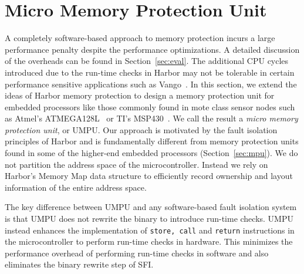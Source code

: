 \section{Micro Memory Protection Unit}
\label{sec:umpu}
%
A completely software-based approach to memory protection incurs a
large performance penalty despite the performance optimizations.
%
A detailed discussion of the overheads can be found in
Section~\ref{sec:eval}.
%
The additional CPU cycles introduced due to the run-time checks in
Harbor may not be tolerable in certain performance sensitive
applications such as Vango~\cite{ben06vango}.
%
In this section, we extend the ideas of Harbor memory protection to
design a memory protection unit for embedded processors like those
%
commonly found in mote class sensor nodes
%
such as Atmel's ATMEGA128L~\cite{avrdatasheet} or TI's
MSP430~\cite{mspdatasheet}.
%
We call the result a \emph{micro memory protection unit}, or UMPU.
%
%
Our approach is motivated by the fault isolation principles of Harbor
and is fundamentally different from memory protection units found in
some of the higher-end embedded processors (Section~\ref{sec:mpu}).
%
We do not partition the address space of the microcontroller.
%
%
%
%
%
Instead we rely on Harbor's Memory Map data structure to efficiently
record ownership and layout information of the entire address space.
%

The key difference between UMPU and any software-based fault isolation
system is that UMPU does not rewrite the binary to introduce run-time
checks.
%
UMPU instead enhances the implementation of \texttt{store, call} and
\texttt{return} instructions in the microcontroller to perform
run-time checks in hardware.
%
This minimizes the performance overhead of performing run-time checks
in software and also eliminates the binary rewrite step of SFI.

